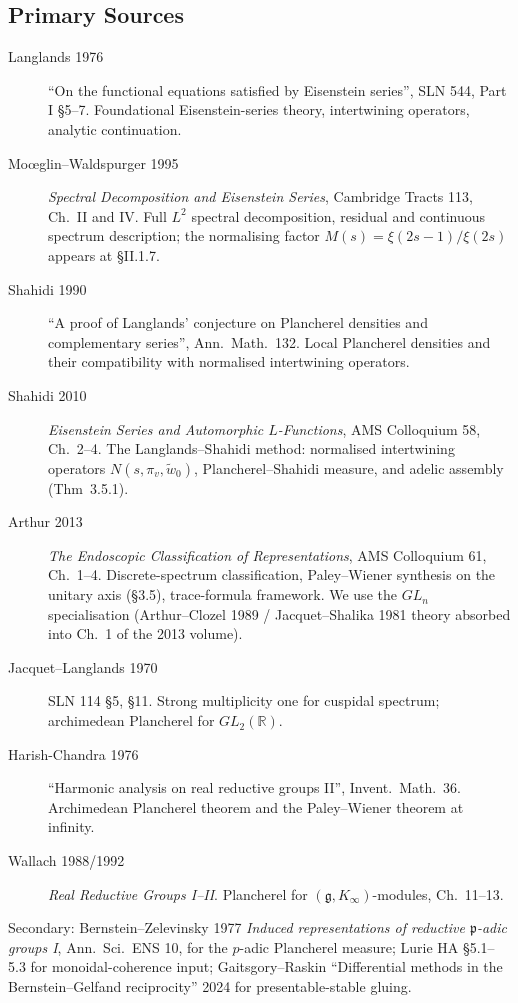 \subsection{Primary Sources}
\label{v4-arith:w6-d:domain:sources}

\begin{description}
\item[Langlands 1976] ``On the functional equations satisfied by
Eisenstein series'', SLN 544, Part I \S 5--7. Foundational
Eisenstein-series theory, intertwining operators, analytic
continuation.
\item[Mo{\oe}glin--Waldspurger 1995] \emph{Spectral Decomposition and
Eisenstein Series}, Cambridge Tracts 113, Ch.~II and IV. Full
\(L^{2}\) spectral decomposition, residual and continuous spectrum
description; the normalising factor \(M(s)=\xi(2s-1)/\xi(2s)\)
appears at \S II.1.7.
\item[Shahidi 1990] ``A proof of Langlands' conjecture on Plancherel
densities and complementary series'', Ann.\ Math.\ 132. Local
Plancherel densities and their compatibility with normalised
intertwining operators.
\item[Shahidi 2010] \emph{Eisenstein Series and Automorphic
\(L\)-Functions}, AMS Colloquium 58, Ch.~2--4. The
Langlands--Shahidi method: normalised intertwining operators
\(N(s,\pi_{v},\tilde w_{0})\), Plancherel--Shahidi measure, and
adelic assembly (Thm~3.5.1).
\item[Arthur 2013] \emph{The Endoscopic Classification of
Representations}, AMS Colloquium 61, Ch.~1--4. Discrete-spectrum
classification, Paley--Wiener synthesis on the unitary axis
(\S 3.5), trace-formula framework. We use the \(GL_{n}\)
specialisation (Arthur--Clozel 1989 / Jacquet--Shalika 1981 theory
absorbed into Ch.~1 of the 2013 volume).
\item[Jacquet--Langlands 1970] SLN 114 \S 5, \S 11. Strong
multiplicity one for cuspidal spectrum; archimedean Plancherel
for \(GL_{2}(\mathbb{R})\).
\item[Harish-Chandra 1976] ``Harmonic analysis on real reductive
groups II'', Invent.\ Math.\ 36. Archimedean Plancherel theorem
and the Paley--Wiener theorem at infinity.
\item[Wallach 1988/1992] \emph{Real Reductive Groups I--II}. Plancherel
for \((\mathfrak{g},K_{\infty})\)-modules, Ch.~11--13.
\end{description}

Secondary: Bernstein--Zelevinsky 1977 \emph{Induced representations
of reductive \(\mathfrak{p}\)-adic groups I}, Ann.\ Sci.\ ENS 10, for
the \(p\)-adic Plancherel measure; Lurie HA \S 5.1--5.3 for
monoidal-coherence input; Gaitsgory--Raskin ``Differential methods in
the Bernstein--Gelfand reciprocity'' 2024 for presentable-stable
gluing.

